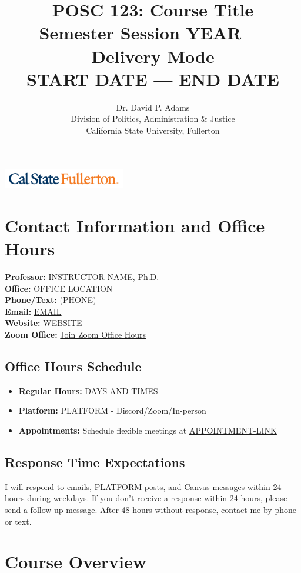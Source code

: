 \documentclass[12pt]{article}
\title{\textbf{POSC 123: Course Title} \\
       \large Semester Session YEAR — Delivery Mode \\
       \normalsize START DATE — END DATE}
\author{Dr. David P. Adams \\
        Division of Politics, Administration \& Justice \\
        California State University, Fullerton}
\date{}
\begin{document}
\maketitle

\begin{center}
\includegraphics[width=0.4\textwidth, alt={Cal State Fullerton logo}]{csuf_logo.png}
\end{center}

\section*{Contact Information and Office Hours}

\textbf{Professor:} INSTRUCTOR NAME, Ph.D.\\
\textbf{Office:} OFFICE LOCATION\\
\textbf{Phone/Text:} \href{tel:+1PHONE}{(PHONE)}\\
\textbf{Email:} \href{mailto:EMAIL}{EMAIL}\\
\textbf{Website:} \href{https://WEBSITE}{WEBSITE}\\
\textbf{Zoom Office:} \href{https://ZOOM-LINK}{Join Zoom Office Hours}

\subsection*{Office Hours Schedule}
\begin{itemize}
\item \textbf{Regular Hours:} DAYS AND TIMES
\item \textbf{Platform:} PLATFORM - Discord/Zoom/In-person
\item \textbf{Appointments:} Schedule flexible meetings at \href{https://APPOINTMENT-LINK}{APPOINTMENT-LINK}
\end{itemize}

\subsection*{Response Time Expectations}
I will respond to emails, PLATFORM posts, and Canvas messages within 24 hours during weekdays. If you don't receive a response within 24 hours, please send a follow-up message. After 48 hours without response, contact me by phone or text.

\section*{Course Overview}
\end{document}
